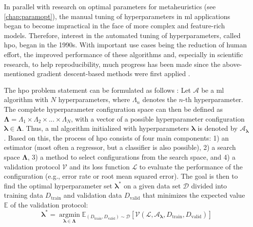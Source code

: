 In parallel with research on optimal parameters for metaheuristics (see \ref{chap:paramopt}), the manual tuning of hyperparameters in \gls{ml} applications began to become impractical in the face of more complex and feature-rich models. Therefore, interest in the automated tuning of hyperparameters, called \gls{hpo}, began in the 1990s. With important use cases being the reduction of human effort, the improved performance of these algorithms and, especially in scientific research, to help reproducibility, much progress has been made since the above-mentioned gradient descent-based methods were first applied  \cite{feurer2019hyperparameter}. 

The \gls{hpo} problem statement can be formulated as follows \cite{feurer2019hyperparameter}:
Let $\mathcal{A}$ be a \gls{ml} algorithm with $N$ hyperparameters, where $\Lambda_n$ denotes the $n$-th hyperparameter. The complete hyperparameter configuration space can then be defined as $\mathbf{\Lambda} = \Lambda_1 \times \Lambda_2 \times ... \times \Lambda_N$, with a vector of a possible hyperparameter configuration $\mathbf{\lambda} \in \mathbf{\Lambda}$. Thus, a \gls{ml} algorithm initialized with hyperparameters $\mathbf{\lambda}$ is denoted by $\mathcal{A}_\mathbf{\lambda}$.
Based on this, the process of \gls{hpo} consists of four main components: 1) an estimator (most often a regressor, but a classifier is also possible), 2) a search space $\mathbf{\Lambda}$, 3) a method to select configurations from the search space, and 4) a validation protocol $\mathcal{V}$ and its loss function $\mathcal{L}$ to evaluate the performance of the configuration (e.g., error rate or root mean squared error). 
The goal is then to find the optimal hyperparameter set $\mathbf{\lambda^*}$ on a given data set $\mathcal{D}$ divided into training data $D_\text{train}$ and validation data $D_\text{valid}$ that minimizes the expected value $\mathbb{E}$ of the validation protocol:
\begin{equation}
	\label{eq:hpo}
	\mathbf{\lambda^*} = \operatorname*{argmin}_{\mathbf{\lambda} \in \mathbf{\Lambda}} \mathbb{E}_{(D_\text{train}, D_\text{valid}) \sim \mathcal{D}} \left[ \mathcal{V}(\mathcal{L}, \mathcal{A}_\mathbf{\lambda}, D_\text{train}, D_\text{valid}) \right] 
\end{equation}

